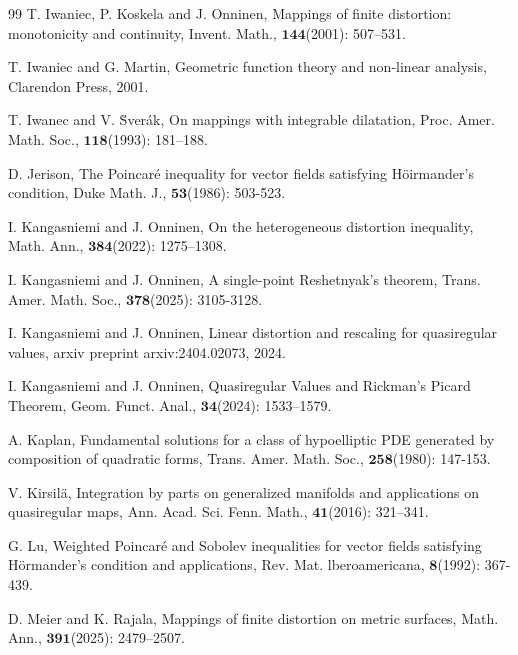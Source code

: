 \documentclass[11pt,twoside]{article}
\theoremstyle{definition}
\theoremstyle{remark}
\begin{document}
\begin{thebibliography}{99}
T. Iwaniec, P. Koskela and J. Onninen, Mappings of finite distortion: monotonicity and continuity, Invent. Math., $\mathbf{144}$(2001): 507–531.

T. Iwaniec and G. Martin, Geometric function theory and non-linear analysis, Clarendon Press, 2001.


T. Iwanec and V. \u{S}ver\'{a}k, On mappings with integrable dilatation, Proc. Amer. Math. Soc., $\mathbf{118}$(1993): 181–188.


D. Jerison, The Poincar\'{e} inequality for vector fields satisfying H\"{o}irmander's condition, Duke Math. J., $\mathbf{53}$(1986): 503-523. 


I. Kangasniemi and J. Onninen, On the heterogeneous distortion inequality, Math. Ann., $\mathbf{384}$(2022): 1275–1308.

I. Kangasniemi and J. Onninen, A single-point Reshetnyak’s theorem, Trans. Amer. Math. Soc., $\mathbf{378}$(2025): 3105-3128.  



I. Kangasniemi and  J. Onninen, Linear distortion and rescaling for quasiregular values, arxiv preprint arxiv:2404.02073, 2024.

I. Kangasniemi and J. Onninen, Quasiregular Values and Rickman's Picard Theorem, Geom. Funct. Anal., $\mathbf{34}$(2024): 1533–1579.

A. Kaplan,  Fundamental solutions for a class of hypoelliptic PDE generated by composition of quadratic forms, Trans. Amer. Math. Soc., $\mathbf{258}$(1980): 147-153.




V. Kirsil\"{a}, Integration by parts on generalized manifolds and applications on quasiregular maps, Ann. Acad. Sci. Fenn. Math., $\mathbf{41}$(2016): 321–341.






G. Lu,  Weighted Poincar\'{e} and Sobolev inequalities for vector fields satisfying H\"{o}rmander's condition and applications, Rev. Mat. lberoamericana,  $\mathbf{8}$(1992): 367-439. 








D. Meier and K. Rajala, Mappings of finite distortion on metric surfaces, Math. Ann., $\mathbf{391}$(2025): 2479–2507. 





\end{thebibliography}
\end{document}

